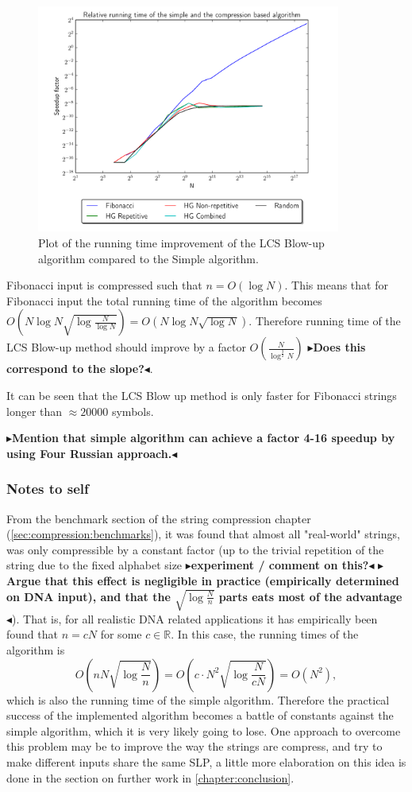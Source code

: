 \documentclass[twoside,11pt,openright]{report}
\newcommand{\todo}[1]{{\color[rgb]{.5,0,0}\textbf{$\blacktriangleright$#1$\blacktriangleleft$}}}
\begin{document}
\begin{figure}[!htb]
  \centering
  \includegraphics[width=10cm]{combined/simple_vs_lcs}
  \caption{Plot of the running time improvement of the LCS Blow-up algorithm compared to the Simple algorithm.}
  \label{fig:benchmark:simple-vs-lcsblowup}
\end{figure}

Fibonacci input is compressed such that $n = O(\log{N})$. This means that for Fibonacci input the total running time of the algorithm becomes $O\left( N\log{N} \sqrt{\log{\frac{N}{\log{N}}}} \right) = O(N\log{N}\sqrt{\log{N}})$. Therefore running time of the LCS Blow-up method should improve by a factor $O\left( \frac{N}{\log^{\frac{3}{2}}{N}} \right)$ \todo{Does this correspond to the slope?}.

It can be seen that the LCS Blow up method is only faster for Fibonacci strings longer than $\approx 20000$ symbols.

\todo{Mention that simple algorithm can achieve a factor 4-16 speedup by using Four Russian approach.}

\subsubsection{Notes to self}
From the benchmark section of the string compression chapter (\cref{sec:compression:benchmarks}), it was found that almost all "real-world" strings, was only compressible by a constant factor (up to the trivial repetition of the string due to the fixed alphabet size \todo{experiment / comment on this?} \todo{Argue that this effect is negligible in practice (empirically determined on DNA input), and that the $\sqrt{\log{\frac{N}{n}}}$ parts eats most of the advantage}). That is, for all realistic DNA related applications it has empirically been found that $n = cN$ for some $c \in \mathbb{R}$. In this case, the running times of the algorithm is
\[
  O\left( nN\sqrt{\log{\frac{N}{n}}} \right) = O\left( c \cdot N^2 \sqrt{\log{\frac{N}{cN}}} \right) = O(N^2),
\]
which is also the running time of the simple algorithm. Therefore the practical success of the implemented algorithm becomes a battle of constants against the simple algorithm, which it is very likely going to lose. One approach to overcome this problem may be to improve the way the strings are compress, and try to make different inputs share the same SLP, a little more elaboration on this idea is done in the section on further work in \cref{chapter:conclusion}.
\end{document}
